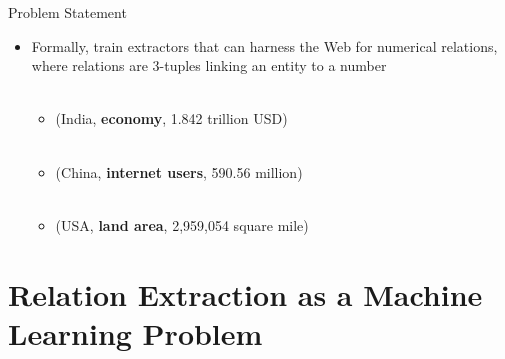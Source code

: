 \documentclass{beamer}
\begin{document}
\begin{frame}{Problem Statement}
\begin{itemize}
 \item Formally, train extractors that can harness the Web for numerical relations, where relations are 3-tuples linking an entity
to a number \\~\\
   
    \begin{itemize}
	\item  (India, \textbf{economy}, 1.842 trillion USD) \\~\\
	\item  (China, \textbf{internet users},  590.56 million) \\~\\
	\item  (USA, \textbf{land area}, 2,959,054 square mile)
    \end{itemize}

 \end{itemize}
\end{frame}


\section{Relation Extraction as a Machine Learning Problem}
\end{document}
